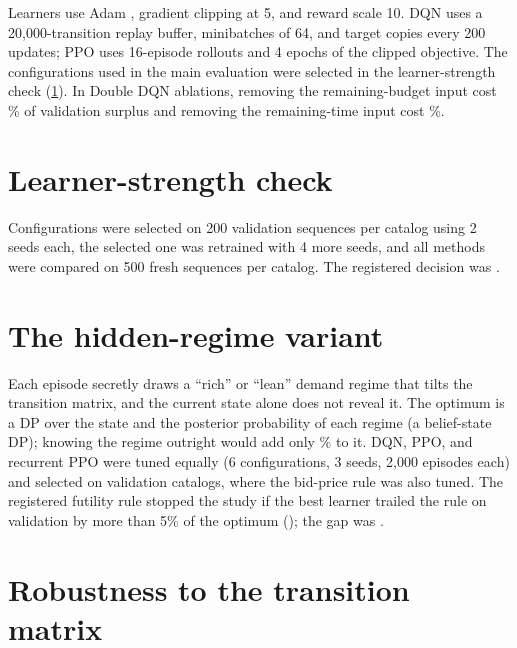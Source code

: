 \documentclass[10pt]{article}
\begin{document}
Learners use Adam \citep{kingma2015adam}, gradient clipping at 5, and reward scale 10. DQN uses a 20{,}000-transition replay buffer, minibatches of 64, and target copies every 200 updates; PPO uses 16-episode rollouts and 4 epochs of the clipped objective. The configurations used in the main evaluation were selected in the learner-strength check (\cref{app:strength}). In Double DQN ablations, removing the remaining-budget input cost \ablDropNoBudget\% of validation surplus and removing the remaining-time input cost \ablDropNoHorizon\%.

\section{Learner-strength check}\label{app:strength}

Configurations were selected on 200 validation sequences per catalog using 2 seeds each, the selected one was retrained with 4 more seeds, and all methods were compared on 500 fresh sequences per catalog. The registered decision was \texttt{\lsDecision}.

\begin{table}[H]
\centering\small
\caption{Learner-strength check on validation catalogs. The comparison column gives the percentage of the online-DP optimum (\lsOnlineMean), with the mean surplus in parentheses.}

\end{table}

\section{The hidden-regime variant}\label{app:regime}

Each episode secretly draws a ``rich'' or ``lean'' demand regime that tilts the transition matrix, and the current state alone does not reveal it. The optimum is a DP over the state and the posterior probability of each regime (a belief-state DP); knowing the regime outright would add only \hrRegimeOracle\% to it. DQN, PPO, and recurrent PPO were tuned equally (6 configurations, 3 seeds, 2{,}000 episodes each) and selected on validation catalogs, where the bid-price rule was also tuned. The registered futility rule stopped the study if the best learner trailed the rule on validation by more than 5\% of the optimum (\rgMargin); the gap was \rgGap.

\section{Robustness to the transition matrix}\label{app:transitions}
\end{document}
